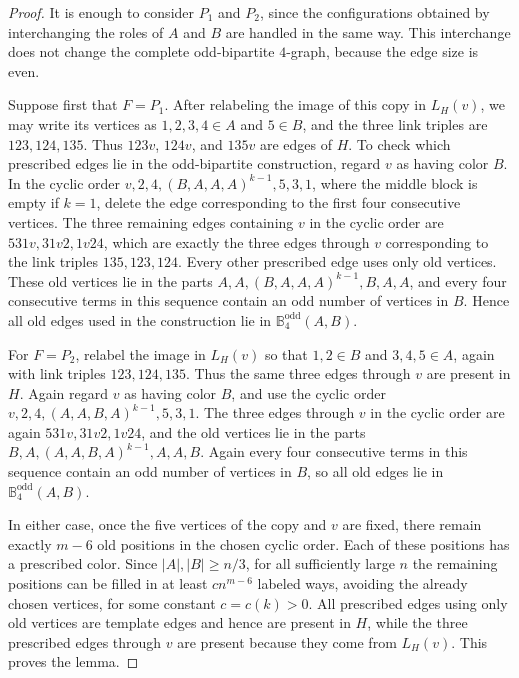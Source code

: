 \documentclass[10pt,a4paper]{article}
\theoremstyle{plain}
\theoremstyle{definition}
\begin{document}
\begin{proof}
It is enough to consider $P_1$ and $P_2$, since the configurations obtained by interchanging the roles of $A$ and $B$ are handled in the same way. This interchange does not change the complete odd-bipartite $4$-graph, because the edge size is even.

Suppose first that $F=P_1$. After relabeling the image of this copy in $L_H(v)$, we may write its vertices as $1,2,3,4\in A$ and $5\in B$, and the three link triples are $123,124,135$. Thus $123v$, $124v$, and $135v$ are edges of $H$. To check which prescribed edges lie in the odd-bipartite construction, regard $v$ as having color $B$. In the cyclic order $v,2,4,(B,A,A,A)^{k-1},5,3,1$, where the middle block is empty if $k=1$, delete the edge corresponding to the first four consecutive vertices. The three remaining edges containing $v$ in the cyclic order are $531v, 31v2, 1v24$, which are exactly the three edges through $v$ corresponding to the link triples $135,123,124$. Every other prescribed edge uses only old vertices. These old vertices lie in the parts $A,A,(B,A,A,A)^{k-1},B,A,A$, and every four consecutive terms in this sequence contain an odd number of vertices in $B$. Hence all old edges used in the construction lie in $\mathbb{B}_4^{\mathrm{odd}}(A,B)$.

For $F=P_2$, relabel the image in $L_H(v)$ so that $1,2\in B$ and $3,4,5\in A$, again with link triples $123,124,135$. Thus the same three edges through $v$ are present in $H$. Again regard $v$ as having color $B$, and use the cyclic order $v,2,4,(A,A,B,A)^{k-1},5,3,1$. The three edges through $v$ in the cyclic order are again $531v,31v2,1v24$, and the old vertices lie in the parts $B,A,(A,A,B,A)^{k-1},A,A,B$. Again every four consecutive terms in this sequence contain an odd number of vertices in $B$, so all old edges lie in $\mathbb{B}_4^{\mathrm{odd}}(A,B)$.

In either case, once the five vertices of the copy and $v$ are fixed, there remain exactly $m-6$ old positions in the chosen cyclic order. Each of these positions has a prescribed color. Since $|A|,|B|\ge n/3$, for all sufficiently large $n$ the remaining positions can be filled in at least $c n^{m-6}$ labeled ways, avoiding the already chosen vertices, for some constant $c=c(k)>0$. All prescribed edges using only old vertices are template edges and hence are present in $H$, while the three prescribed edges through $v$ are present because they come from $L_H(v)$. This proves the lemma.
\end{proof}
\end{document}
